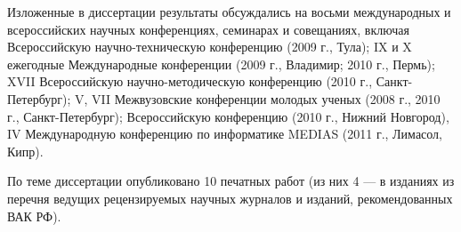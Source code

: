  Изложенные в диссертации результаты обсуждались на восьми международных и всероссийских научных конференциях, семинарах и совещаниях, включая Всероссийскую научно-техническую конференцию  (2009 г., Тула); IX и X ежегодные Международные конференции  (2009 г., Владимир; 2010 г., Пермь); XVII Всероссийскую научно-методическую конференцию  (2010 г., Санкт-Петербург); V, VII Межвузовские конференции молодых ученых (2008 г., 2010 г., Санкт-Петербург); Всероссийскую конференцию  (2010 г., Нижний Новгород), IV Международную конференцию по информатике MEDIAS (2011 г., Лимасол, Кипр).

 По теме диссертации опубликовано 10 печатных работ (из них 4 — в изданиях из перечня ведущих рецензируемых научных журналов и изданий, рекомендованных ВАК РФ).
